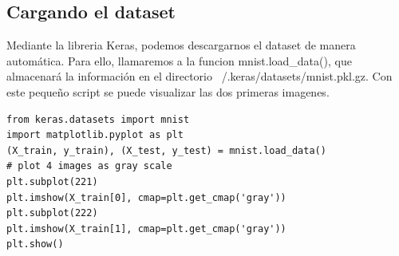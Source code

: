 \subsection{Cargando el dataset}
Mediante la libreria Keras, podemos descargarnos el dataset de manera automática. Para ello, llamaremos a la funcion mnist.load\_data(), que almacenará la información en el directorio ~/.keras/datasets/mnist.pkl.gz. Con este pequeño script se puede visualizar las dos primeras imagenes.
\begin{verbatim}
from keras.datasets import mnist
import matplotlib.pyplot as plt
(X_train, y_train), (X_test, y_test) = mnist.load_data()
# plot 4 images as gray scale
plt.subplot(221)
plt.imshow(X_train[0], cmap=plt.get_cmap('gray'))
plt.subplot(222)
plt.imshow(X_train[1], cmap=plt.get_cmap('gray'))
plt.show()
\end{verbatim}

